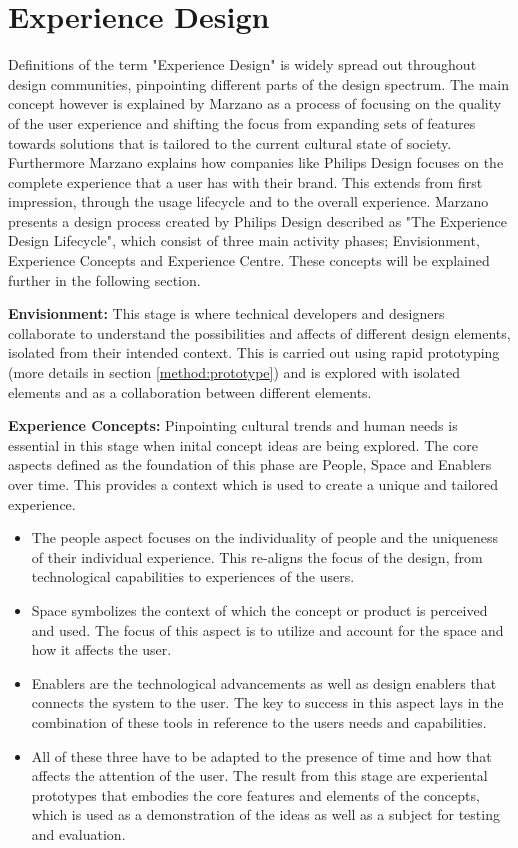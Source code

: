 \section{Experience Design}
\label{intro:experiencedesign}
Definitions of the term "Experience Design" is widely spread out throughout design communities, pinpointing different parts of the design spectrum. The main concept however is explained by Marzano as a process of focusing on the quality of the user experience and shifting the focus from expanding sets of features towards solutions that is tailored to the current cultural state of society\cite{experience_design:marzano2003new}. Furthermore Marzano explains how companies like Philips Design focuses on the complete experience that a user has with their brand. This extends from first impression, through the usage lifecycle and to the overall experience. Marzano presents a design process created by Philips Design described as "The Experience Design Lifecycle", which consist of three main activity phases; Envisionment, Experience Concepts and Experience Centre. These concepts will be explained further in the following section.

\textbf{Envisionment:}
This stage is where technical developers and designers collaborate to understand the possibilities and affects of different design elements, isolated from their intended context. This is carried out using rapid prototyping (more details in section \ref{method:prototype}) and is explored with isolated elements and as a collaboration between different elements.

\textbf{Experience Concepts:}
Pinpointing cultural trends and human needs is essential in this stage when inital concept ideas are being explored. The core aspects defined as the foundation of this phase are People, Space and Enablers over time. This provides a context which is used to create a  unique and tailored experience.
\begin{itemize}
  \item The people aspect focuses on the individuality of people and the uniqueness of their individual experience. This re-aligns the focus of the design, from technological capabilities to experiences of the users.
  \item Space symbolizes the context of which the concept or product is perceived and used. The focus of this aspect is to utilize and account for the space and how it affects the user.
  \item Enablers are the technological advancements as well as design enablers that connects the system to the user. The key to success in this aspect lays in the combination of these tools in reference to the users needs and capabilities.
  \item All of these three have to be adapted to the presence of time and how that affects the attention of the user. The result from this stage are experiental prototypes that embodies the core features and elements of the concepts, which is used as a demonstration of the ideas as well as a subject for testing and evaluation.
\end{itemize}

